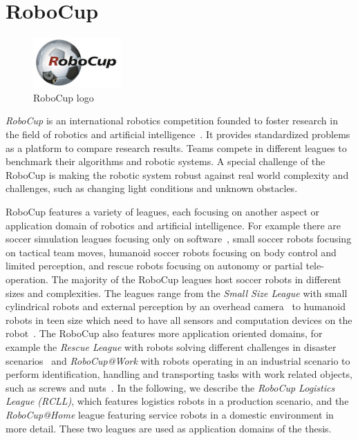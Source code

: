 \section{RoboCup}
\label{sec:robocup}
\begin{figure}
  \centering
  \vspace{-2.7ex}
  \includegraphics[width=0.3\textwidth]{img/robocup-logo}
  \vspace{-4ex}
  \caption[RoboCup logo]{RoboCup logo}
  \label{fig:rcll}
  \vspace{-2ex}
\end{figure}
\emph{RoboCup} is an international robotics competition founded to
foster research in the field of robotics and artificial
intelligence~\cite{RoboCup-Paper,Gazsim-Thesis}. It provides
standardized problems as a platform to compare research results. Teams
compete in different leagues to benchmark their algorithms and robotic
systems. A special challenge of the RoboCup is making the robotic
system robust against real world complexity and challenges, such as
changing light conditions and unknown obstacles.

RoboCup features a variety of leagues, each focusing on another aspect
or application domain of robotics and artificial intelligence.  For
example there are soccer simulation leagues focusing only on
software~\cite{simspark_old}, small soccer robots focusing on tactical
team moves, humanoid soccer robots focusing on body control and
limited perception, and rescue robots focusing on autonomy or partial
tele-operation. The majority of the RoboCup leagues host soccer robots
in different sizes and complexities. The leagues range from the
\emph{Small Size League} with small cylindrical robots and external
perception by an overhead camera~\cite{rc-ssl} to humanoid
robots in teen size which need to have all sensors and computation
devices on the robot~\cite{rc-book}. The RoboCup also features more
application oriented domains, for example the \emph{Rescue League} with
robots solving different challenges in disaster
scenarios~\cite{rc-rescue} and \emph{RoboCup@Work} with robots
operating in an industrial scenario to perform identification,
handling and transporting tasks with work related objects, such as
screws and nuts~\cite{rc-work}. In the following, we describe the
\emph{RoboCup Logistics League (RCLL)}, which features logistics
robots in a production scenario, and the \emph{RoboCup@Home} league
featuring service robots in a domestic environment in more
detail. These two leagues are used as application domains of the
thesis.

